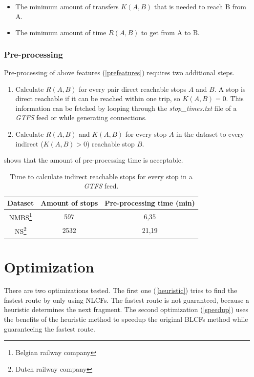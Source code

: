 \documentclass[twocolumn]{phdsymp} %
\begin{document}
\begin{itemize}
\label{prefeatures}
\item The minimum amount of transfers $K(A, B)$ that is needed to reach B from A.
\item The minimum amount of time $R(A, B)$ to get from A to B.
\end{itemize}

\subsubsection{Pre-processing}

Pre-processing of above features (\cref{prefeatures}) requires two additional steps.
\begin{enumerate}
\item Calculate $R(A,B)$ for every pair direct reachable stops $A$ and $B$. A stop is direct reachable if it can be reached within one trip, so $K(A,B) = 0$. This information can be fetched by looping through the \textit{stop\_times.txt} file of a \textit{GTFS} feed or while generating connections.
\item Calculate $R(A,B)$ and $K(A,B)$ for every stop $A$ in the dataset to every indirect ($K(A,B)>0$) reachable stop $B$.
\end{enumerate}

 shows that the amount of pre-processing time is acceptable.
\begin{table}[htbp]
\centering
\begin{tabular}{ | c || c | c | }
  \hline
  Dataset & Amount of stops & Pre-processing time (min) \\ \hline
  NMBS\footnote{Belgian railway company} & 597 & 6,35 \\
  NS\footnote{Dutch railway company} & 2532 & 21,19 \\
\hline  
\end{tabular}
\caption{Time to calculate indirect reachable stops for every stop in a \textit{GTFS} feed.}
\label{table:calcneighbours}
\end{table}

\section{Optimization}
\label{optimization}

There are two optimizations tested. The first one (\cref{heuristic}) tries to find the fastest route by only using NLCFs. The fastest route is not guaranteed, because a heuristic determines the next fragment. The second optimization (\cref{speedup}) uses the benefits of the heuristic method to speedup the original BLCFs method while guaranteeing the fastest route.
\end{document}
